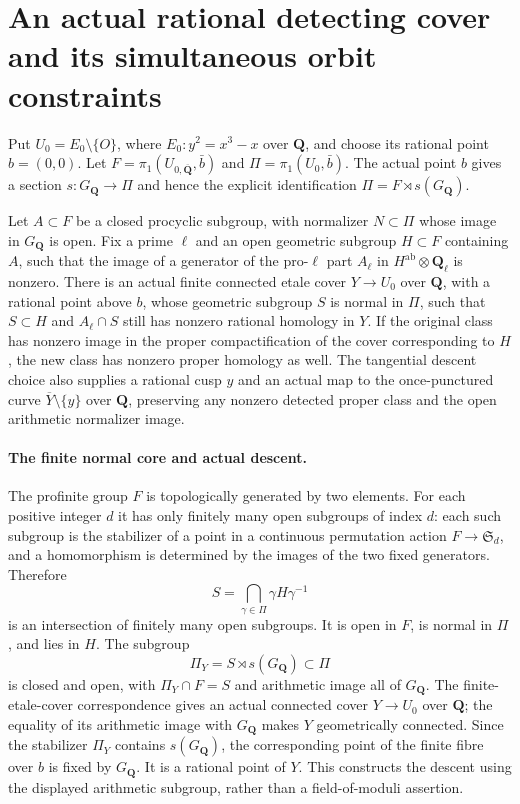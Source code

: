 \section*{An actual rational detecting cover and its simultaneous orbit constraints}

Put $U_0=E_0\setminus\{O\}$, where $E_0:y^2=x^3-x$ over
$\mathbf Q$, and choose its rational point $b=(0,0)$.
Let $F=\pi_1(U_{0,\overline{\mathbf Q}},\bar b)$ and
$\Pi=\pi_1(U_0,\bar b)$. The actual point $b$ gives a section
$s:G_{\mathbf Q}\to\Pi$ and hence the explicit identification
$\Pi=F\rtimes s(G_{\mathbf Q})$.

Let $A\subset F$ be a closed procyclic subgroup, with normalizer
$N\subset\Pi$ whose image in $G_{\mathbf Q}$ is open. Fix a prime
$\ell$ and an open geometric subgroup $H\subset F$ containing
$A$, such that the image of a generator of the pro-$\ell$ part
$A_\ell$ in $H^{\mathrm{ab}}\otimes\mathbf Q_\ell$ is nonzero.
There is an actual finite connected etale cover $Y\to U_0$ over
$\mathbf Q$, with a rational point above $b$, whose geometric
subgroup $S$ is normal in $\Pi$, such that
$S\subset H$ and $A_\ell\cap S$ still has nonzero rational
homology in $Y$. If the original class has nonzero image in
the proper compactification of the cover corresponding to $H$,
the new class has nonzero proper homology as well.
The tangential descent choice also supplies a rational
cusp $y$ and an actual map to the once-punctured curve
$\overline Y\setminus\{y\}$ over $\mathbf Q$, preserving
any nonzero detected proper class and the open arithmetic
normalizer image.

\paragraph{The finite normal core and actual descent.}
The profinite group $F$ is topologically generated by two
elements. For each positive integer $d$ it has only finitely
many open subgroups of index $d$: each such subgroup is the
stabilizer of a point in a continuous permutation action
$F\to\mathfrak S_d$, and a homomorphism is determined by the
images of the two fixed generators. Therefore
\[
 S=\bigcap_{\gamma\in\Pi}\gamma H\gamma^{-1}
\]
is an intersection of finitely many open subgroups. It is
open in $F$, is normal in $\Pi$, and lies in $H$.
The subgroup
\[
 \Pi_Y=S\rtimes s(G_{\mathbf Q})\subset\Pi
\]
is closed and open, with $\Pi_Y\cap F=S$ and arithmetic image
all of $G_{\mathbf Q}$. The finite-etale-cover correspondence
gives an actual connected cover $Y\to U_0$ over $\mathbf Q$;
the equality of its arithmetic image with $G_{\mathbf Q}$
makes $Y$ geometrically connected. Since the stabilizer
$\Pi_Y$ contains $s(G_{\mathbf Q})$, the corresponding point
of the finite fibre over $b$ is fixed by $G_{\mathbf Q}$.
It is a rational point of $Y$. This constructs the descent
using the displayed arithmetic subgroup, rather than a
field-of-moduli assertion.

